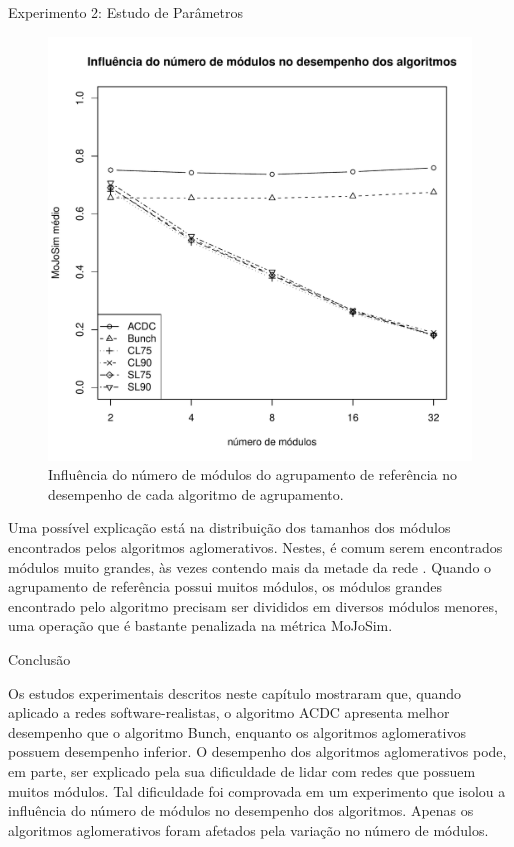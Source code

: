 \begin{section}{Experimento 2: Estudo de Parâmetros}
\begin{figure}[htbp]
	\centering
		\includegraphics[scale=0.5]{figuras/mojosim-vs-modules}
	\caption{Influência do número de módulos do agrupamento de referência no desempenho de cada algoritmo de agrupamento.}
	\label{fig:mojosim-vs-modules}
\end{figure}

Uma possível explicação está na distribuição dos tamanhos dos módulos encontrados pelos algoritmos aglomerativos. Nestes, é comum serem encontrados módulos muito grandes, às vezes contendo mais da metade da rede \cite{Wu2005}. Quando o agrupamento de referência possui muitos módulos, os módulos grandes encontrado pelo algoritmo precisam ser divididos em diversos módulos menores, uma operação que é bastante penalizada na métrica MoJoSim.


\end{section}

\begin{section}{Conclusão}

Os estudos experimentais descritos neste capítulo mostraram que, quando aplicado a redes software-realistas, o algoritmo ACDC apresenta melhor desempenho que o algoritmo Bunch, enquanto os algoritmos aglomerativos possuem desempenho inferior. O desempenho dos algoritmos aglomerativos pode, em parte, ser explicado pela sua dificuldade de lidar com redes que possuem muitos módulos. Tal dificuldade foi comprovada em um experimento que isolou a influência do número de módulos no desempenho dos algoritmos. Apenas os algoritmos aglomerativos foram afetados pela variação no número de módulos.

\end{section}
